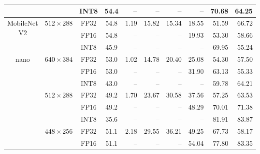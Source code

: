 \begin{appendices}
\begin{table}[h]
\begin{threeparttable}
\begin{tabular}{|c|c|c|c|rrrrrr|}
                                                                    &                                   & INT8 & 54.4 &    -- &     -- &    -- &    -- & 70.68 &  64.25 \\
            \hline
            \multirow{3}{*}{\parbox{1.6cm}{\centering MobileNet\\V2}} & \multirow{3}{*}{$512 \times 288$} & FP32 & 54.8 &  1.19 &  15.82 & 15.34 & 18.55 & 51.59 &  66.72 \\
                                                                    &                                   & FP16 & 54.8 &    -- &     -- &    -- & 19.93 & 53.30 &  58.66 \\
                                                                    &                                   & INT8 & 45.9 &    -- &     -- &    -- &    -- & 69.95 &  55.24 \\
            \hline
            \multirow{9}{*}{nano}                                     & \multirow{3}{*}{$640 \times 384$} & FP32 & 53.0 &  1.02 &  14.78 & 20.40 & 25.08 & 54.30 &  57.50 \\
                                                                    &                                   & FP16 & 53.0 &    -- &     -- &    -- & 31.90 & 63.13 &  55.33 \\
                                                                    &                                   & INT8 & 43.0 &    -- &     -- &    -- &    -- & 59.78 &  64.21 \\
            \cline{2-10}
                                                                    & \multirow{3}{*}{$512 \times 288$} & FP32 & 49.2 &  1.70 &  23.67 & 30.58 & 37.56 & 57.25 &  63.53 \\
                                                                    &                                   & FP16 & 49.2 &    -- &     -- &    -- & 48.29 & 70.01 &  71.38 \\
                                                                    &                                   & INT8 & 35.6 &    -- &     -- &    -- &    -- & 81.91 &  83.87 \\
            \cline{2-10}
                                                                    & \multirow{3}{*}{$448 \times 256$} & FP32 & 51.1 &  2.18 &  29.55 & 36.21 & 49.25 & 67.73 &  58.17 \\
                                                                    &                                   & FP16 & 51.1 &    -- &     -- &    -- & 54.04 & 77.80 &  83.35 \\

\end{tabular}
\end{threeparttable}
\end{table}
\end{appendices}
